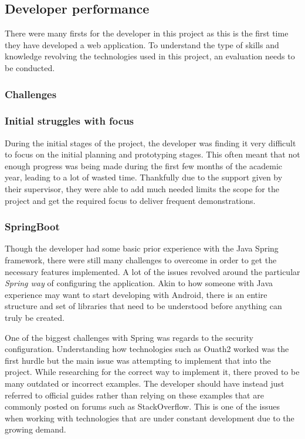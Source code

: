 \subsection{Developer performance}

There were many firsts for the developer in this project as this is the first time they have developed a web application.
To understand the type of skills and knowledge revolving the technologies used in this project, an evaluation needs to be conducted.


\subsubsection{Challenges}

\subsubsection*{Initial struggles with focus} \label{focusissues}
During the initial stages of the project, the developer was finding it very difficult to focus on the initial planning and prototyping stages.
This often meant that not enough progress was being made during the first few months of the academic year, leading to a lot of wasted time.
Thankfully due to the support given by their supervisor, they were able to add much needed limits the scope for the project and get the required 
focus to deliver frequent demonstrations.

\subsubsection*{SpringBoot}
Though the developer had some basic prior experience with the Java Spring framework, there were still many challenges to overcome 
in order to get the necessary features implemented.
A lot of the issues revolved around the particular \emph{Spring way} of configuring the application.
Akin to how someone with Java experience may want to start developing with Android, there is an entire structure and set of libraries
that need to be understood before anything can truly be created.

One of the biggest challenges with Spring was regards to the security configuration.
Understanding how technologies such as Ouath2 worked was the first hurdle but the main issue was attempting to implement that into the project.
While researching for the correct way to implement it, there proved to be many outdated or incorrect examples. 
The developer should have instead just referred to official guides rather than relying on these examples that are commonly posted on forums
such as StackOverflow.
This is one of the issues when working with technologies that are under constant development due to the growing demand.

